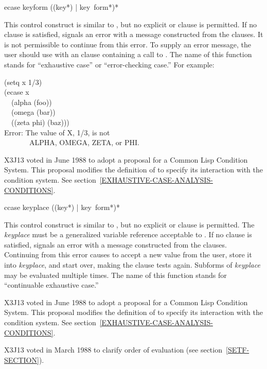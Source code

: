 \begin{defmac}
ecase keyform {({({key}*) | key} {\,form}*)}*

\begin{obsolete}\noindent
This control construct is similar to ,
but no explicit  or  clause is permitted.
If no clause is satisfied,  signals an error with a
message constructed from the clauses.  It is not permissible to continue
from this error.  To supply an error message, the user should use
 with an  clause containing a call to .
The name of this function stands for ``exhaustive case'' or
``error-checking case.'' 
For example:
\begin{lisp}
(setq x 1/3)	 \\
(ecase x \\
~~(alpha (foo)) \\
~~(omega (bar)) \\
~~((zeta phi) (baz))) \\
Error: The value of X, 1/3, is not \\
~~~~~~~ALPHA, OMEGA, ZETA, or PHI.
\end{lisp}
\end{obsolete}

\begin{new}
X3J13 voted in June 1988
to adopt a proposal for a Common Lisp Condition System. 
This proposal modifies the definition of  to specify its
interaction with the condition system.
See section~\ref{EXHAUSTIVE-CASE-ANALYSIS-CONDITIONS}.
\end{new}
\end{defmac}

\begin{defmac}
ccase keyplace {({({key}*) | key} {\,form}*)}*

\begin{obsolete}\noindent
This control construct is similar to ,
but no explicit  or  clause is permitted.
The {\it keyplace} must be a generalized variable reference
acceptable to .  If no clause is satisfied,  signals an error
with a message constructed from the clauses.  Continuing from this error
causes  to accept a new value from the user, store it into
{\it keyplace}, and start over, making the clause tests again.  Subforms of
{\it keyplace} may be evaluated multiple times.  The name of this function
stands for ``continuable exhaustive case.''
\end{obsolete}

\begin{new}
X3J13 voted in June 1988
to adopt a proposal for a Common Lisp Condition System. 
This proposal modifies the definition of  to specify its
interaction with the condition system.
See section~\ref{EXHAUSTIVE-CASE-ANALYSIS-CONDITIONS}.
\end{new}

\begin{newer}
X3J13 voted in March 1988 
to clarify order of evaluation (see section~\ref{SETF-SECTION}).
\end{newer}
\end{defmac}

